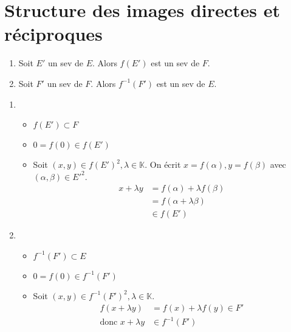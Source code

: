 \documentclass[../main.tex]{subfiles}
\begin{document}
\section{Structure des images directes et réciproques}
\begin{tcolorbox}[title=Propostion 21.16, title filled=false, colframe=lightblue, colback=lightblue!10!white]
    \begin{enumerate}
        \item Soit $E'$ un sev de $E$. Alors $f(E')$ est un sev de $F$.
        \item Soit $F'$ un sev de $F$. Alors $f^{-1}(F')$ est un sev de $E$.
    \end{enumerate}
\end{tcolorbox}

\begin{enumerate}
    \item \begin{itemize}
        \item $f(E') \subset F$
        \item $0 = f(0) \in f(E')$
        \item Soit $(x, y) \in f(E')^2, \lambda \in \mathbb{K}$. On écrit $x = f(\alpha), y = f(\beta)$ avec $(\alpha, \beta) \in E'^2$. \\
        \begin{align*}
            x + \lambda y &= f(\alpha) + \lambda f(\beta) \\
            &= f(\alpha + \lambda \beta) \\
            &\in f(E')
        \end{align*}
    \end{itemize}

    \item \begin{itemize}
        \item $f^{-1}(F') \subset E$
        \item $0 = f(0) \in f^{-1}(F')$
        \item Soit $(x, y) \in f^{-1}(F')^2, \lambda \in \mathbb{K}$. 
        \begin{align*}
            f(x + \lambda y) &= f(x) + \lambda f(y) \in F' \\
            \text{donc } x + \lambda y &\in f^{-1}(F')
        \end{align*}
    \end{itemize}
\end{enumerate}
\end{document}
